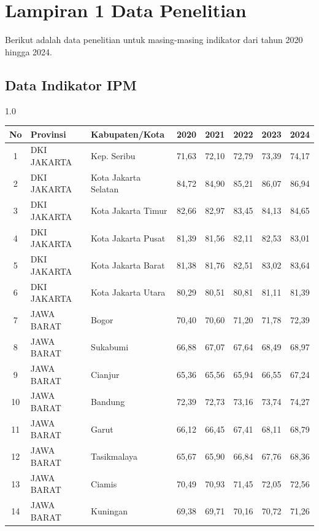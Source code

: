 \chapter*{Lampiran 1 Data Penelitian}
\label{app:data}
Berikut adalah data penelitian untuk masing-masing indikator dari tahun 2020 hingga 2024.
\vspace{1em}
\section*{Data Indikator IPM}
\begin{spacing}{1.0}
\scriptsize
\setlength{\tabcolsep}{2pt}
\begin{longtable}{|c|p{2.2cm}|p{2.8cm}|c|c|c|c|c|}
\hline
\textbf{No} & \textbf{Provinsi} & \textbf{Kabupaten/Kota} & \textbf{2020} & \textbf{2021} & \textbf{2022} & \textbf{2023} & \textbf{2024} \\ \hline
\endhead
1 & DKI JAKARTA & Kep. Seribu & 71,63 & 72,10 & 72,79 & 73,39 & 74,17 \\ \hline
2 & DKI JAKARTA & Kota Jakarta Selatan & 84,72 & 84,90 & 85,21 & 86,07 & 86,94 \\ \hline
3 & DKI JAKARTA & Kota Jakarta Timur & 82,66 & 82,97 & 83,45 & 84,13 & 84,65 \\ \hline
4 & DKI JAKARTA & Kota Jakarta Pusat & 81,39 & 81,56 & 82,11 & 82,53 & 83,01 \\ \hline
5 & DKI JAKARTA & Kota Jakarta Barat & 81,38 & 81,76 & 82,51 & 83,02 & 83,64 \\ \hline
6 & DKI JAKARTA & Kota Jakarta Utara & 80,29 & 80,51 & 80,81 & 81,11 & 81,39 \\ \hline
7 & JAWA BARAT & Bogor & 70,40 & 70,60 & 71,20 & 71,78 & 72,39 \\ \hline
8 & JAWA BARAT & Sukabumi & 66,88 & 67,07 & 67,64 & 68,49 & 68,97 \\ \hline
9 & JAWA BARAT & Cianjur & 65,36 & 65,56 & 65,94 & 66,55 & 67,24 \\ \hline
10 & JAWA BARAT & Bandung & 72,39 & 72,73 & 73,16 & 73,74 & 74,27 \\ \hline
11 & JAWA BARAT & Garut & 66,12 & 66,45 & 67,41 & 68,11 & 68,79 \\ \hline
12 & JAWA BARAT & Tasikmalaya & 65,67 & 65,90 & 66,84 & 67,76 & 68,36 \\ \hline
13 & JAWA BARAT & Ciamis & 70,49 & 70,93 & 71,45 & 72,05 & 72,56 \\ \hline
14 & JAWA BARAT & Kuningan & 69,38 & 69,71 & 70,16 & 70,72 & 71,26 \\ \hline

\end{longtable}
\end{spacing}

